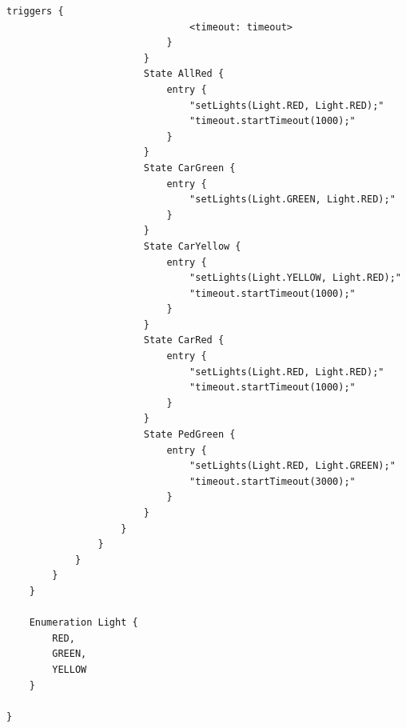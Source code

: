 \begin{lstlisting}[language=ROOM]
							triggers {
								<timeout: timeout>
							}
						}
						State AllRed {
							entry {
								"setLights(Light.RED, Light.RED);"
								"timeout.startTimeout(1000);"
							}
						}
						State CarGreen {
							entry {
								"setLights(Light.GREEN, Light.RED);"
							}
						}
						State CarYellow {
							entry {
								"setLights(Light.YELLOW, Light.RED);"
								"timeout.startTimeout(1000);"
							}
						}
						State CarRed {
							entry {
								"setLights(Light.RED, Light.RED);"
								"timeout.startTimeout(1000);"
							}
						}
						State PedGreen {
							entry {
								"setLights(Light.RED, Light.GREEN);"
								"timeout.startTimeout(3000);"
							}
						}
					}
				}
			}
		}
	}
	
	Enumeration Light {
		RED,
		GREEN,
		YELLOW
	}

}
\end{lstlisting}
